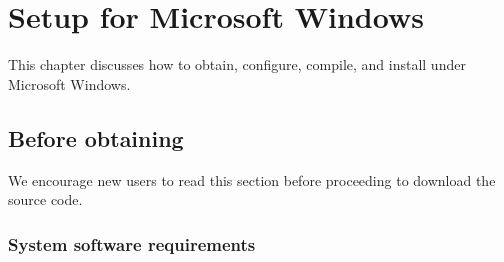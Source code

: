 \chapter{Setup for Microsoft Windows}
\label{chapter:setup-windows}



This chapter discusses how to obtain, configure, compile, and install
\libflame under Microsoft Windows.



\section{Before obtaining \libflame}

We encourage new users to read this section before proceeding to download
the \libflame source code.

\subsection{System software requirements}


